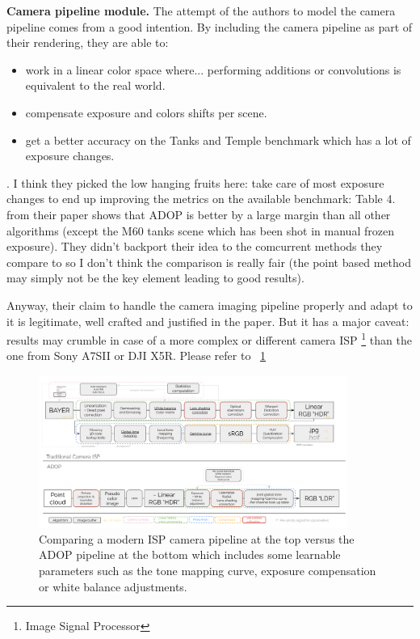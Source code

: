 \noindent \textbf{Camera pipeline module.}
The attempt of the authors to model the camera pipeline comes from a good intention. By including the camera pipeline as part of their rendering, they are able to: 
\begin{itemize}
    \item work in a linear color space where... performing additions or convolutions is equivalent to the real world.
    \item compensate exposure and colors shifts per scene.
    \item get a better accuracy on the Tanks and Temple benchmark which has a lot of exposure changes.
\end{itemize}.
I think they picked the low hanging fruits here: take care of most exposure changes to end up improving the metrics on the available benchmark: Table 4. from their paper shows that ADOP is better by a large margin than all other algorithms (except the M60 tanks scene which has been shot in manual frozen exposure). 
They didn't backport their idea to the comcurrent methods they compare to so I don't think the comparison is really fair (the point based method may simply not be the key element leading to good results).

Anyway, their claim to handle the camera imaging pipeline properly and adapt to it is legitimate, well crafted and justified in the paper. But it has a major caveat: results may crumble in case of a more complex or different camera ISP \footnote{Image Signal Processor} than the one from Sony A7SII or DJI X5R.
Please refer to ~\cref*{fig:ISP}

\begin{figure}[h]
    \centering
    \includegraphics[width=0.9\textwidth]{figures/isp_pipeline_VS_ADOP.png}
    \caption{Comparing a modern ISP camera pipeline at the top versus the ADOP pipeline at the bottom which includes some learnable parameters such as the tone mapping curve, exposure compensation or white balance adjustments.}
    \label{fig:ISP}
\end{figure}


